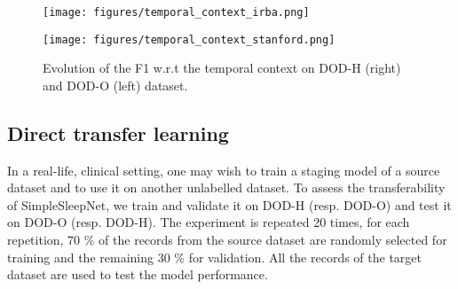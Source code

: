 \documentclass[journal]{IEEEtran}
\begin{document}
\begin{figure}
    \begin{center}
    \begin{minipage}{.5\linewidth}
    \begin{center}
    \texttt{[image: figures/temporal\_context\_irba.png]} 
    \end{center}
    \end{minipage}\begin{minipage}{.5\linewidth}
    \begin{center}
    \texttt{[image: figures/temporal\_context\_stanford.png]} 
    \end{center}
    \end{minipage}
    \caption{Evolution of the F1 w.r.t the temporal context on DOD-H (right) and DOD-O (left) dataset.}
    \label{temporal_context}
    \end{center}
\vspace{-1em}
\end{figure}

\subsection{Direct transfer learning}
In a real-life, clinical setting, one may wish to train a staging model of a source dataset and to use it on another unlabelled dataset. To assess the transferability of SimpleSleepNet, we train and validate it on DOD-H (resp. DOD-O) and test it on DOD-O (resp. DOD-H). The experiment is repeated 20 times, for each repetition, 70 \% of the records from the source dataset are randomly selected for training and the remaining 30 \% for validation. All the records of the target dataset are used to test the model performance.
\end{document}
